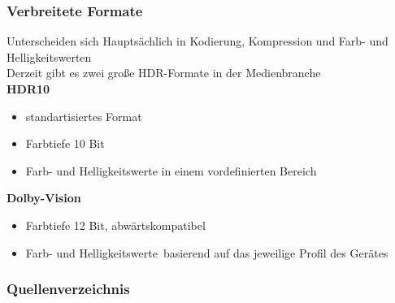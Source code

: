 \documentclass{beamer}
\begin{document}
	\begin{frame}
	\frametitle{Verbreitete Formate}
		Unterscheiden sich Hauptsächlich in Kodierung, Kompression und Farb- und Helligkeitswerten \\
		Derzeit gibt es zwei große HDR-Formate in der Medienbranche \\
		\vspace{5mm}
		\textbf{HDR10}
		\begin{itemize}[label=\textcolor{red!65!black}{\textbullet}]
			\item standartisiertes Format
			\item Farbtiefe 10 Bit
			\item Farb- und Helligkeitswerte in einem vordefinierten Bereich
		\end{itemize}
			\textbf{Dolby-Vision}
		\begin{itemize}[label=\textcolor{red!65!black}{\textbullet}]
			\item Farbtiefe 12 Bit, abwärtskompatibel
			\item Farb- und Helligkeitswerte basierend auf das jeweilige Profil des Gerätes
		\end{itemize}
	\end{frame}

	\begin{frame}[allowframebreaks]
		\frametitle{Quellenverzeichnis}
			\nocite{*}
			
			
	\end{frame}
\end{document}
